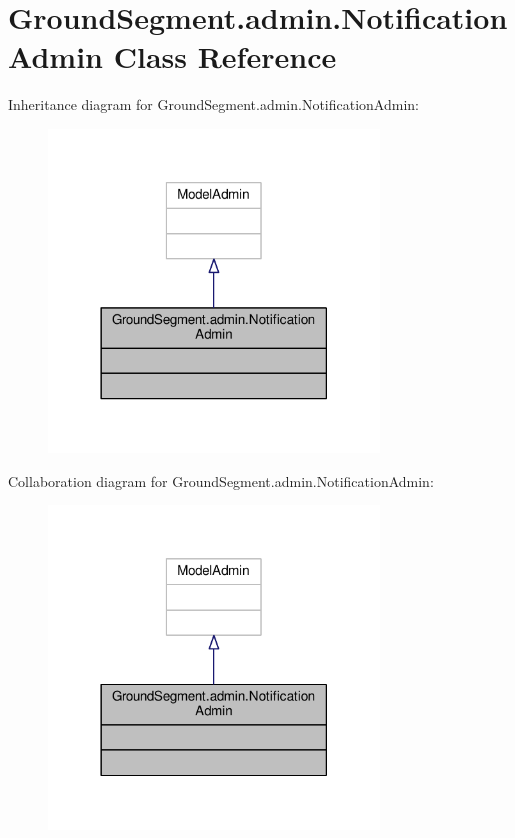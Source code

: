 \hypertarget{class_ground_segment_1_1admin_1_1_notification_admin}{}\section{Ground\+Segment.\+admin.\+Notification\+Admin Class Reference}
\label{class_ground_segment_1_1admin_1_1_notification_admin}


Inheritance diagram for Ground\+Segment.\+admin.\+Notification\+Admin\+:\nopagebreak
\begin{figure}[H]
\begin{center}
\leavevmode
\includegraphics[width=249pt]{class_ground_segment_1_1admin_1_1_notification_admin__inherit__graph}
\end{center}
\end{figure}


Collaboration diagram for Ground\+Segment.\+admin.\+Notification\+Admin\+:\nopagebreak
\begin{figure}[H]
\begin{center}
\leavevmode
\includegraphics[width=249pt]{class_ground_segment_1_1admin_1_1_notification_admin__coll__graph}
\end{center}
\end{figure}


